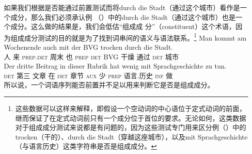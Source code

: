 如果我们根据是否能通过前置测试而将durch die Stadt（通过这个城市）看作是一个成分，那么我们必须承认例
（）中的durch die Stadt（通过这个城市）也是一个成分。这么做的结果是，我们会低估“组成成
分”（constituent）这个术语，因为组成成分测试的目的就是为了找到词串间的语义与语法联系。\footnote{%
这些数据可以这样来解释，即假设一个空动词的中心语位于定式动词的前面，继而保证了在定式动词前只有一个成分位于首位的要求。\citep{Mueller2005d,MuellerGS}无论如何，这类数据对于组成成分测试来说都是有问题的，因为这些测试专门用来区分例（）中的trocken（干的）、durch die Stadt（穿越这座城市），以及mit Sprachgeschichte（与语言历史）这类字符串是否是组成成分。}
\eal
\ex 
\gll Man kommt am Wochenende auch mit der BVG trocken durch die Stadt.\\
     人 来 \textsc{prep}.\textsc{det} 周末 也 \textsc{prep} \textsc{det} BVG 干燥 通过 \textsc{det} 城市\\
\ex 
\gll Der dritte Beitrag in dieser Rubrik hat wenig mit Sprachgeschichte zu tun.\\
     \textsc{det} 第三  文章 在 \textsc{det} 章节  \textsc{aux} 少 \textsc{prep} 语言.历史 \textsc{inf} 做\\
\zl
所以说，一个词语序列能否前置并不足以用来判断它是否是组成成分。

